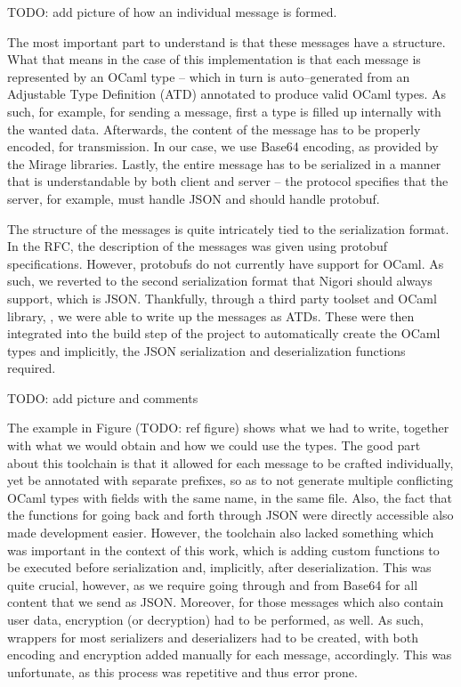 TODO: add picture of how an individual message is formed.

The most important part to understand is that these messages have a structure.
What that means in the case of this implementation is that each message is represented by an OCaml type -- which in turn is auto--generated from an Adjustable Type Definition (ATD) annotated to produce valid OCaml types.
As such, for example, for sending a message, first a type is filled up internally with the wanted data.
Afterwards, the content of the message has to be properly encoded, for transmission.
In our case, we use Base64 encoding, as provided by the Mirage libraries.
Lastly, the entire message has to be serialized in a manner that is understandable by both client and server -- the protocol specifies that the server, for example, must handle JSON and should handle protobuf.

The structure of the messages is quite intricately tied to the serialization format.
In the RFC, the description of the messages was given using protobuf specifications.
However, protobufs do not currently have support for OCaml.
As such, we reverted to the second serialization format that Nigori should always support, which is JSON.
Thankfully, through a third party toolset and OCaml library, , we were able to write up the messages as ATDs.
These were then integrated into the build step of the project to automatically create the OCaml types and implicitly, the JSON serialization and deserialization functions required.

TODO: add picture and comments

The example in Figure (TODO: ref figure) shows what we had to write, together with what we would obtain and how we could use the types.
The good part about this toolchain is that it allowed for each message to be crafted individually, yet be annotated with separate prefixes, so as to not generate multiple conflicting OCaml types with fields with the same name, in the same file.
Also, the fact that the functions for going back and forth through JSON were directly accessible also made development easier.
However, the toolchain also lacked something which was important in the context of this work, which is adding custom functions to be executed before serialization and, implicitly, after deserialization.
This was quite crucial, however, as we require going through and from Base64 for all content that we send as JSON.
Moreover, for those messages which also contain user data, encryption (or decryption) had to be performed, as well.
As such, wrappers for most serializers and deserializers had to be created, with both encoding and encryption added manually for each message, accordingly.
This was unfortunate, as this process was repetitive and thus error prone.

